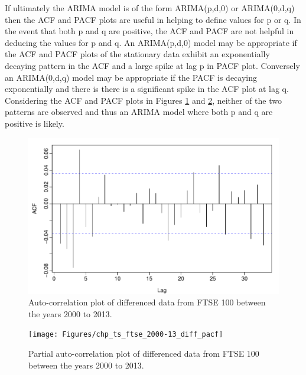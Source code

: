 If ultimately the ARIMA model is of the form ARIMA(p,d,0) or ARIMA(0,d,q) then the ACF and PACF plots are useful in helping to define values for p or q. In the event that both p and q are positive, the ACF and PACF are not helpful in deducing the values for p and q. An ARIMA(p,d,0) model may be appropriate if the ACF and PACF plots of the stationary data exhibit an exponentially decaying pattern in the ACF and a large spike at lag p in PACF plot. Conversely an ARIMA(0,d,q) model may be appropriate if the PACF is decaying exponentially and there is there is a significant spike in the ACF plot at lag q. Considering the ACF and PACF plots in Figures \ref{fig:chp_ts_ftse_2000-13_diff_acf} and \ref{fig:chp_ts_ftse_2000-13_diff_pacf}, neither of the two patterns are observed and thus an ARIMA model where both p and q are positive is likely.

\begin{figure}[tbh]
\centering
\includegraphics{Figures/chp_ts_ftse_2000-13_diff_acf}
\caption[ACF of FTSE 100 between between the years 2000 to 2013]{Auto-correlation plot of differenced data from FTSE 100 between the years 2000 to 2013.}
\label{fig:chp_ts_ftse_2000-13_diff_acf}
\end{figure}

\begin{figure}[tbh]
\centering
\texttt{[image: Figures/chp\_ts\_ftse\_2000-13\_diff\_pacf]}
\caption[PACF of FTSE 100 between between the years 2000 to 2013]{Partial auto-correlation plot of differenced data from FTSE 100 between the years 2000 to 2013.}
\label{fig:chp_ts_ftse_2000-13_diff_pacf}
\end{figure}

\textquotesingle\newpage
